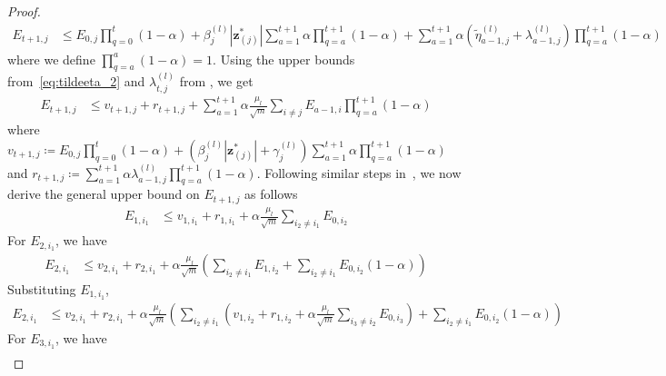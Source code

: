 \documentclass[10pt]{article} %
\newcommand{\z}{{\bm z}}
\begin{document}
\begin{proof}
\begin{equation}
\begin{aligned}
E_{t+1, j} &\leq E_{0,j} \prod_{q=0}^t (1 - \alpha) + \beta_j^{(l)} | \z^{\ast}_{(j)} | \sum_{a=1}^{t+1} \alpha \prod_{q=a}^{t+1} (1 - \alpha) + \sum_{a=1}^{t+1} \alpha (\tilde \eta_{a-1,j}^{(l)} + \lambda_{a-1,j}^{(l)} ) \prod_{q=a}^{t+1} (1 - \alpha)
\end{aligned}
\end{equation}
where we define $ \prod_{q=a}^a (1 - \alpha) = 1$. Using the upper bounds from~\eqref{eq:tildeeta_2} and $\lambda_{t,j}^{(l)}$ from , we get
\begin{equation}
\begin{aligned}
E_{t+1, j} &\leq v_{t+1, j} + r_{t+1, j} + \sum_{a=1}^{t+1} \alpha \frac{\mu_l}{\sqrt{m}} \sum_{i \neq j} E_{a-1, i} \prod_{q=a}^{t+1} (1 - \alpha)
\end{aligned}
\end{equation}
where $v_{t+1, j} \coloneqq E_{0, j} \prod_{q=0}^t (1 - \alpha) + (\beta_j^{(l)} | \z^{\ast}_{(j)} | + \gamma_j^{(l)}) \sum_{a=1}^{t+1} \alpha \prod_{q=a}^{t+1} (1 - \alpha)$ and $r_{t+1, j} \coloneqq \sum_{a=1}^{t+1} \alpha \lambda_{a-1, j}^{(l)} \prod_{q=a}^{t+1} (1 - \alpha)$. Following similar steps in~, we now derive the general upper bound on $E_{t+1, j}$ as follows
\begin{equation}
\begin{aligned}
E_{1, i_1} &\leq v_{1, i_1} + r_{1, i_1} + \alpha \frac{\mu_l}{\sqrt{m}} \sum_{i_2 \neq i_1} E_{0, i_2}
\end{aligned}
\end{equation}
For $E_{2, i_1}$, we have
\begin{equation}
\begin{aligned}
E_{2, i_1} &\leq v_{2, i_1} + r_{2, i_1} + \alpha \frac{\mu_l}{\sqrt{m}} (\sum_{i_2 \neq i_1} E_{1, i_2} + \sum_{i_2 \neq i_1} E_{0, i_2} (1 - \alpha))
\end{aligned}
\end{equation}
Substituting $E_{1, i_1}$,
\begin{equation}
\begin{aligned}
E_{2, i_1} &\leq v_{2, i_1} +  r_{2, i_1} + \alpha \frac{\mu_l}{\sqrt{m}} (\sum_{i_2 \neq i_1}  (v_{1, i_2} +  r_{1, i_2} + \alpha \frac{\mu_l}{\sqrt{m}} \sum_{i_3 \neq i_2} E_{0, i_3}) + \sum_{i_2 \neq i_1} E_{0, i_2} (1 - \alpha))
\end{aligned}
\end{equation}
For $E_{3, i_1}$, we have
\begin{equation}
\begin{aligned}

\end{aligned}
\end{equation}
\end{proof}
\end{document}

